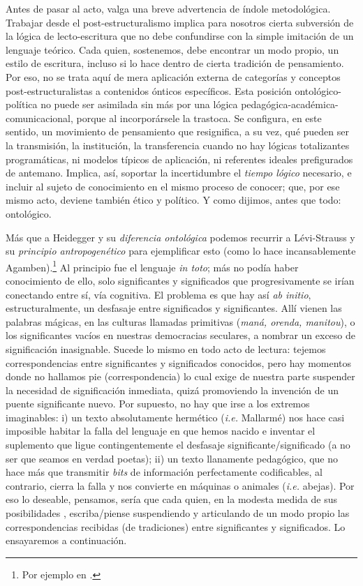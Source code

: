 Antes de pasar al acto, valga una breve advertencia de índole metodológica. Trabajar desde el post-estructuralismo implica para nosotros cierta subversión de la lógica de lecto-escritura que no debe confundirse con la simple imitación de un lenguaje teórico. Cada quien, sostenemos, debe encontrar un modo propio, un estilo de escritura, incluso si lo hace dentro de cierta tradición de pensamiento. Por eso, no se trata aquí de mera aplicación externa de categorías y conceptos post-estructuralistas a contenidos ónticos específicos. Esta posición ontológico-política no puede ser asimilada sin más por una lógica pedagógica-académica-comunicacional, porque al incorporársele la trastoca. Se configura, en este sentido, un movimiento de pensamiento que resignifica, a su vez, qué pueden ser la transmisión, la institución, la transferencia cuando no hay lógicas totalizantes programáticas, ni modelos típicos de aplicación, ni referentes ideales prefigurados de antemano. Implica, así, soportar la incertidumbre el \emph{tiempo lógico} necesario, e incluir al sujeto de conocimiento en el mismo proceso de conocer; que, por ese mismo acto, deviene también ético y político. Y como dijimos, antes que todo: ontológico.

Más que a Heidegger y su \emph{diferencia ontológica} podemos recurrir a Lévi-Strauss y su \emph{principio antropogenético} para ejemplificar esto (como lo hace incansablemente Agamben).\footnote{Por ejemplo en \cite[27]{@7073-AGAMBEN2010}.
} Al principio fue el lenguaje \emph{in toto}; más no podía haber conocimiento de ello, solo significantes y significados que progresivamente se irían conectando entre sí, vía cognitiva. El problema es que hay así \emph{ab initio}, estructuralmente, un desfasaje entre significados y significantes. Allí vienen las palabras mágicas, en las culturas llamadas primitivas (\emph{maná, orenda, manitou}), o los significantes vacíos en nuestras democracias seculares, a nombrar un exceso de significación inasignable. Sucede lo mismo en todo acto de lectura: tejemos correspondencias entre significantes y significados conocidos, pero hay momentos donde no hallamos pie (correspondencia) lo cual exige de nuestra parte suspender la necesidad de significación inmediata, quizá promoviendo la invención de un puente significante nuevo. Por supuesto, no hay que irse a los extremos imaginables: i) un texto absolutamente hermético (\emph{i.e.} Mallarmé) nos hace casi imposible habitar la falla del lenguaje en que hemos nacido e inventar el suplemento que ligue contingentemente el desfasaje significante/significado (a no ser que seamos en verdad poetas); ii) un texto llanamente pedagógico, que no hace más que transmitir \emph{bits} de información perfectamente codificables, al contrario, cierra la falla y nos convierte en máquinas o animales (\emph{i.e.} abejas). Por eso lo deseable, pensamos, sería que cada quien, en la modesta medida de sus posibilidades , escriba/piense suspendiendo y articulando de un modo propio las correspondencias recibidas (de tradiciones) entre significantes y significados. Lo ensayaremos a continuación.


